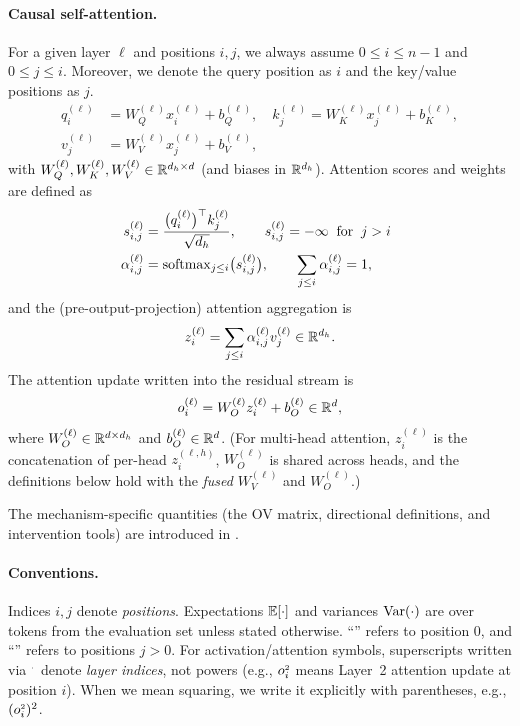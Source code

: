 \documentclass{article}
\theoremstyle{plain}
\theoremstyle{definition}
\theoremstyle{remark}
\begin{document}
\paragraph{Causal self-attention.}
For a given layer $\ell$ and positions $i, j$, we always assume $0\le i \le n-1$ and $0\le j \le i$.
Moreover, we denote the query position as $i$ and the key/value positions as $j$.
\begin{align}
q_i^{(\ell)} &= W_Q^{(\ell)} x_i^{(\ell)} + b_Q^{(\ell)},\quad
k_j^{(\ell)} = W_K^{(\ell)} x_j^{(\ell)} + b_K^{(\ell)}, \\
v_j^{(\ell)} &= W_V^{(\ell)} x_j^{(\ell)} + b_V^{(\ell)},
\end{align}
with $W_Q^{(\ell)},W_K^{(\ell)},W_V^{(\ell)}\in\mathbb{R}^{d_h\times d}$ (and biases in $\mathbb{R}^{d_h}$).
Attention scores and weights are defined as
\begin{align}
s_{i,j}^{(\ell)} &= \frac{\big(q_i^{(\ell)}\big)^\top k_j^{(\ell)}}{\sqrt{d_h}},
\qquad
s_{i,j}^{(\ell)}=-\infty \;\;\text{for}\;\; j>i \;\; \\
\alpha_{i,j}^{(\ell)} &= \operatorname{softmax}_{j\le i}\!\big(s_{i,j}^{(\ell)}\big),
\qquad
\sum_{j\le i}\alpha_{i,j}^{(\ell)}=1,
\end{align}
and the (pre-output-projection) attention aggregation is
\begin{equation}
z_i^{(\ell)} = \sum_{j\le i}\alpha_{i,j}^{(\ell)} v_j^{(\ell)} \in \mathbb{R}^{d_h}.
\end{equation}
The attention update written into the residual stream is
\begin{equation}
\label{eq:attn_output}
o_i^{(\ell)} = W_O^{(\ell)} z_i^{(\ell)} + b_O^{(\ell)} \in \mathbb{R}^d,
\end{equation}
where $W_O^{(\ell)}\in\mathbb{R}^{d\times d_h}$ and $b_O^{(\ell)}\in\mathbb{R}^d$.
(For multi-head attention, $z_i^{(\ell)}$ is the concatenation of per-head $z_i^{(\ell,h)}$, $W_O^{(\ell)}$ is shared across heads,
and the definitions below hold with the \emph{fused} $W_V^{(\ell)}$ and $W_O^{(\ell)}$.)

The mechanism-specific quantities (the OV matrix, directional
definitions, and intervention tools) are introduced in
.

\paragraph{Conventions.}
Indices $i,j$ denote \emph{positions}. Expectations $\mathbb{E}[\cdot]$ and variances $\mathrm{Var}(\cdot)$ are over tokens
from the evaluation set unless stated otherwise.
``\bos'' refers to position $0$, and ``\nbos'' refers to positions $j>0$.
For activation/attention symbols, superscripts written via $^{\scriptscriptstyle \cdot}$ denote \emph{layer indices}, not powers
(e.g., $o_{i}^{\scriptscriptstyle 2}$ means Layer~2 attention update at position $i$).
When we mean squaring, we write it explicitly with parentheses, e.g., $(o_{i}^{\scriptscriptstyle 2})^2$.
 
\end{document}
